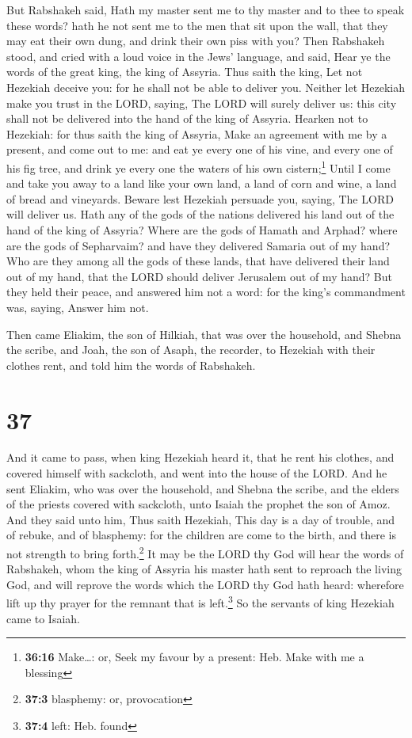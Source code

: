  But Rabshakeh said, Hath my master sent me to thy master
and to thee to speak these words? hath he not sent me to the men that
sit upon the wall, that they may eat their own dung, and drink their own
piss with you?  Then Rabshakeh stood, and cried with a
loud voice in the Jews' language, and said, Hear ye the words of the
great king, the king of Assyria.  Thus saith the king,
Let not Hezekiah deceive you: for he shall not be able to deliver you.
 Neither let Hezekiah make you trust in the LORD, saying,
The LORD will surely deliver us: this city shall not be delivered into
the hand of the king of Assyria.  Hearken not to
Hezekiah: for thus saith the king of Assyria, Make an agreement with me
by a present, and come out to me: and eat ye every one of his vine, and
every one of his fig tree, and drink ye every one the waters of his own
cistern;\footnote{\textbf{36:16} Make\ldots: or, Seek my favour by a
  present: Heb. Make with me a blessing}  Until I come
and take you away to a land like your own land, a land of corn and wine,
a land of bread and vineyards.  Beware lest Hezekiah
persuade you, saying, The LORD will deliver us. Hath any of the gods of
the nations delivered his land out of the hand of the king of Assyria?
 Where are the gods of Hamath and Arphad? where are the
gods of Sepharvaim? and have they delivered Samaria out of my hand?
 Who are they among all the gods of these lands, that
have delivered their land out of my hand, that the LORD should deliver
Jerusalem out of my hand?  But they held their peace, and
answered him not a word: for the king's commandment was, saying, Answer
him not.

 Then came Eliakim, the son of Hilkiah, that was over the
household, and Shebna the scribe, and Joah, the son of Asaph, the
recorder, to Hezekiah with their clothes rent, and told him the words of
Rabshakeh.

\hypertarget{section-36}{%
\section{37}\label{section-36}}

 And it came to pass, when king Hezekiah heard it, that he
rent his clothes, and covered himself with sackcloth, and went into the
house of the LORD.  And he sent Eliakim, who was over the
household, and Shebna the scribe, and the elders of the priests covered
with sackcloth, unto Isaiah the prophet the son of Amoz. 
And they said unto him, Thus saith Hezekiah, This day is a day of
trouble, and of rebuke, and of blasphemy: for the children are come to
the birth, and there is not strength to bring forth.\footnote{\textbf{37:3}
  blasphemy: or, provocation}  It may be the LORD thy God
will hear the words of Rabshakeh, whom the king of Assyria his master
hath sent to reproach the living God, and will reprove the words which
the LORD thy God hath heard: wherefore lift up thy prayer for the
remnant that is left.\footnote{\textbf{37:4} left: Heb. found}
 So the servants of king Hezekiah came to Isaiah.

